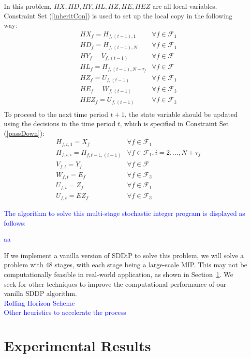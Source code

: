 \documentclass[12pt]{article}
\begin{document}
	In this problem, \(HX,HD,HY,HL,HZ,HE,HEZ\) are all local variables. Constraint Set (\ref{inheritCon}) is used to set up the local copy in the following way:
	\begin{align*}
		& HX_f = H_{f,(t-1),1}& \forall f \in \mathcal{F}_1\\
		& HD_f = H_{f,(t-1),N}& \forall f \in \mathcal{F}_1\\
		& HY_f = V_{f,(t-1)}& \forall f \in \mathcal{F}\\
		& HL_f = H_{f,(t-1),N+\tau_{f}}& \forall f \in \mathcal{F}\\
		& HZ_f = U_{f,(t-1)}& \forall f \in \mathcal{F}_1\\
		& HE_f = W_{f,(t-1)}& \forall f \in \mathcal{F}_3\\
		& HEZ_f = U_{f,(t-1)}& \forall f \in \mathcal{F}_3\\
	\end{align*}
	To proceed to the next time period \(t+1\), the state variable should be updated using the decisions in the time period \(t\), which is specified in Constraint Set (\ref{passDown}):
	\begin{align*}
		& H_{f,t,1} = X_f & \forall f \in \mathcal{F}_1\\
		& H_{f,t,i} = H_{f,t-1,(i-1)} & \forall f \in \mathcal{F}_1, i = 2, \dots, N+\tau_f\\
		& V_{f,t} = Y_f & \forall f \in \mathcal{F}\\
		& W_{f,t} = E_f & \forall f \in \mathcal{F}_3\\
		& U_{f,t} = Z_f & \forall f \in \mathcal{F}_1\\
		& U_{f,t} = EZ_f & \forall f \in \mathcal{F}_3
	\end{align*}
	\textcolor{blue}{The algorithm to solve this multi-stage stochastic integer program is displayed as follows:\\
	\begin{algorithm}[H]
		aa
	\end{algorithm}}
	\noindent If we implement a vanilla version of SDDiP to solve this problem, we will solve a problem with 48 stages, with each stage being a large-scale MIP. This may not be computationally feasible in real-world application, as shown in Section~\ref{expResults}. We seek for other techniques to improve the computational performance of our vanilla SDDP algorithm.\\
	\newline
	\textcolor{blue}{Rolling Horizon Scheme}\\
	\textcolor{blue}{Other heuristics to accelerate the process}
\section{Experimental Results}\label{expResults}

\nocite{*}


\end{document}
